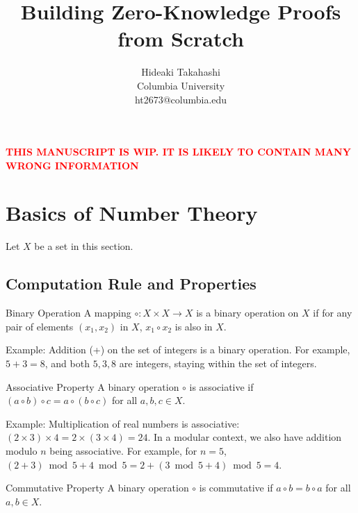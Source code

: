 \documentclass{article}
\title{Building Zero-Knowledge Proofs from Scratch
}
\author{
    Hideaki Takahashi \\
    Columbia University \\
    ht2673@columbia.edu
}
\begin{document}
\maketitle






\textbf{\textcolor{red}{THIS MANUSCRIPT IS WIP. IT IS LIKELY TO CONTAIN MANY WRONG INFORMATION}}

\tableofcontents

\section{Basics of Number Theory}

Let $X$ be a set in this section.

\subsection{Computation Rule and Properties}

\begin{definition}{Binary Operation}{}
A mapping $\circ: X \times X \rightarrow X$ is a binary operation on $X$ if for any pair of elements $(x_1, x_2)$ in $X$, $x_1 \circ x_2$ is also in $X$.
\end{definition}

Example: Addition (+) on the set of integers is a binary operation. For example, $5 + 3 = 8$, and both $5, 3, 8$ are integers, staying within the set of integers.

\begin{definition}{Associative Property}{}
A binary operation $\circ$ is associative if $(a \circ b) \circ c = a \circ (b \circ c)$ for all $a, b, c \in X$.
\end{definition}

Example: Multiplication of real numbers is associative: $(2 \times 3) \times 4 = 2 \times (3 \times 4) = 24$. In a modular context, we also have addition modulo $n$ being associative. For example, for $n = 5$, $(2 + 3) \bmod 5 + 4 \bmod 5 = 2 + (3 \bmod 5 + 4) \bmod 5 = 4$.

\begin{definition}{Commutative Property}{}
A binary operation $\circ$ is commutative if $a \circ b = b \circ a$ for all $a, b \in X$.
\end{definition}
\end{document}
